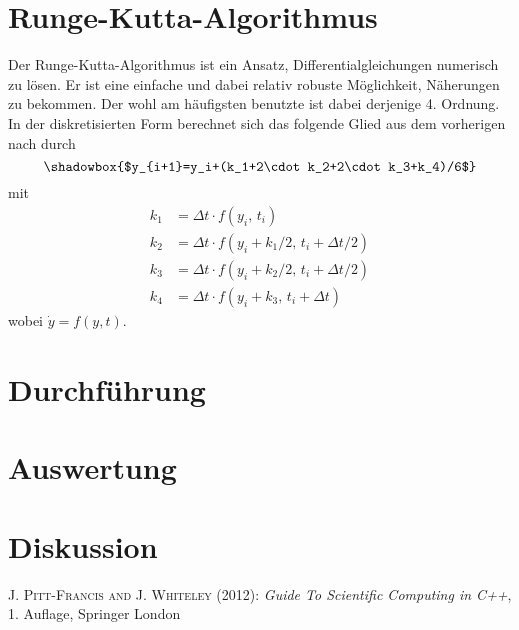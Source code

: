 \documentclass[12pt,a4paper,titlepage,headinclude,bibtotoc]{scrartcl}
\begin{document}
\section{Runge-Kutta-Algorithmus}
Der Runge-Kutta-Algorithmus ist ein Ansatz, Differentialgleichungen numerisch zu lösen.
Er ist eine einfache und dabei relativ robuste Möglichkeit, Näherungen zu bekommen.
Der wohl am häufigsten benutzte ist dabei derjenige 4. Ordnung.
In der diskretisierten Form berechnet sich das folgende Glied aus dem vorherigen nach \cite[S.130]{scientificcomp} durch
$$\shadowbox{$y_{i+1}=y_i+(k_1+2\cdot k_2+2\cdot k_3+k_4)/6$}$$ 
mit
\begin{align*}
k_1&=\Delta t\cdot f(y_i,\, t_i)\\
k_2&=\Delta t\cdot f(y_i+k_1/2,\, t_i+\Delta t/2)\\
k_3&=\Delta t\cdot f(y_i+k_2/2,\, t_i+\Delta t/2)\\
k_4&=\Delta t\cdot f(y_i+k_3,\, t_i+\Delta t)
\end{align*}
wobei $\dot y=f(y,t)$.

\section{Durchführung}
\label{sec:durchfuehrung}

\section{Auswertung}
\label{sec:auswertung}

\section{Diskussion}
\label{sec:diskussion}

\begin{thebibliography}{1000}

	\textsc{J. Pitt-Francis and J. Whiteley} (2012): \emph{Guide To Scientific Computing in C++},
	1. Auflage, Springer London

\end{thebibliography}
\end{document}
